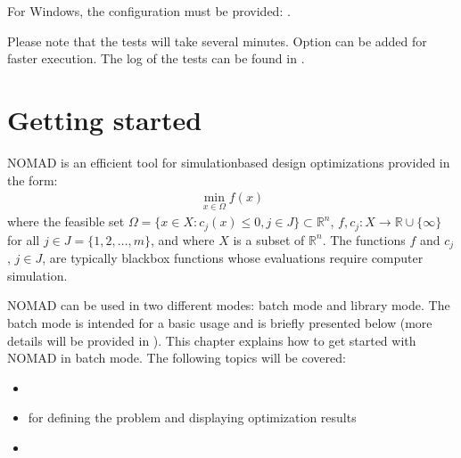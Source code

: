 \documentclass[letterpaper,10pt,english]{sphinxmanual}
\begin{document}
\sphinxAtStartPar
For Windows, the configuration must be provided: .

\sphinxAtStartPar
Please note that the tests will take several minutes. Option  can be added for faster execution.
The log of the tests can be found in .


\chapter{Getting started}
\label{\detokenize{GettingStarted:getting-started}}\label{\detokenize{GettingStarted:id1}}\label{\detokenize{GettingStarted::doc}}
\sphinxAtStartPar
NOMAD is an efficient tool for simulation\sphinxhyphen{}based design optimizations provided in the form:
\begin{equation*}
\begin{split}\min_{x \in \Omega} f(x)\end{split}
\end{equation*}
\sphinxAtStartPar
where the feasible set \(\Omega = \{ x \in X : c_j(x) \leq 0, j \in J\} \subset \mathbb{R}^n\), \(f, c_j : X \rightarrow \mathbb{R} \cup \{ \infty \}\)
for  all \(j \in J= \{ 1,2,\ldots,m \}\), and where \(X\) is a subset of \(\mathbb{R}^n\).
The functions \(f\) and \(c_j\), \(j \in J\), are typically blackbox functions whose evaluations require computer simulation.

\sphinxAtStartPar
NOMAD can be used in two different modes: batch mode and library mode.
The batch mode is intended for a basic usage and is briefly presented below (more details will be provided in {\hyperref[\detokenize{HowToUseNomad:basic-nomad-usage}]{}}).
This chapter explains how to get started with NOMAD in batch mode. The following topics will be covered:
\begin{itemize}
\item {} 
\sphinxAtStartPar
{\hyperref[\detokenize{GettingStarted:create-blackbox-program}]{}}

\item {} 
\sphinxAtStartPar
{\hyperref[\detokenize{GettingStarted:provide-parameters}]{}} for defining the problem and displaying optimization results

\item {} 
\sphinxAtStartPar
{\hyperref[\detokenize{GettingStarted:conduct-optimization}]{}}

\end{itemize}
\end{document}
